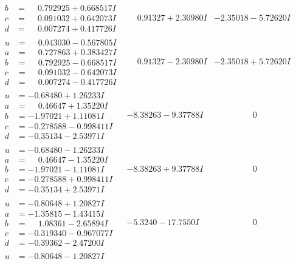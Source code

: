 \documentclass[1p]{elsarticle_modified}
\theoremstyle{definition}
\begin{document}
$$\begin{array}{c|c|c}
\begin{aligned}
b &= \phantom{-}0.792925 + 0.668517 I \\
c &= \phantom{-}0.091032 + 0.642073 I \\
d &= \phantom{-}0.007274 + 0.417726 I\end{aligned}
 & \phantom{-}0.91327 + 2.30980 I & -2.35018 - 5.72620 I \\ \hline\begin{aligned}
u &= \phantom{-}0.043030 - 0.567805 I \\
a &= \phantom{-}0.727863 + 0.383427 I \\
b &= \phantom{-}0.792925 - 0.668517 I \\
c &= \phantom{-}0.091032 - 0.642073 I \\
d &= \phantom{-}0.007274 - 0.417726 I\end{aligned}
 & \phantom{-}0.91327 - 2.30980 I & -2.35018 + 5.72620 I \\ \hline\begin{aligned}
u &= -0.68480 + 1.26233 I \\
a &= \phantom{-}0.46647 + 1.35220 I \\
b &= -1.97021 + 1.11081 I \\
c &= -0.278588 - 0.998411 I \\
d &= -0.35134 - 2.53971 I\end{aligned}
 & -8.38263 - 9.37788 I & \phantom{-0.000000 } 0 \\ \hline\begin{aligned}
u &= -0.68480 - 1.26233 I \\
a &= \phantom{-}0.46647 - 1.35220 I \\
b &= -1.97021 - 1.11081 I \\
c &= -0.278588 + 0.998411 I \\
d &= -0.35134 + 2.53971 I\end{aligned}
 & -8.38263 + 9.37788 I & \phantom{-0.000000 } 0 \\ \hline\begin{aligned}
u &= -0.80648 + 1.20827 I \\
a &= -1.35815 - 1.43415 I \\
b &= \phantom{-}1.08361 - 2.65894 I \\
c &= -0.319340 - 0.967077 I \\
d &= -0.39362 - 2.47200 I\end{aligned}
 & -5.3240 - 17.7550 I & \phantom{-0.000000 } 0 \\ \hline\begin{aligned}
u &= -0.80648 - 1.20827 I \\

\end{aligned}
\end{array}$$
\end{document}
